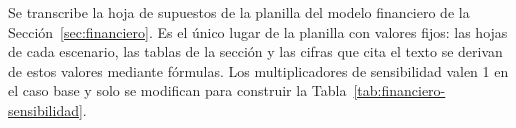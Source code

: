 \label{anexo:financiero}

Se transcribe la hoja de supuestos de la planilla del modelo financiero de la Sección~\ref{sec:financiero}. Es el único lugar de la planilla con valores fijos: las hojas de cada escenario, las tablas de la sección y las cifras que cita el texto se derivan de estos valores mediante fórmulas. Los multiplicadores de sensibilidad valen 1 en el caso base y solo se modifican para construir la Tabla~\ref{tab:financiero-sensibilidad}.


